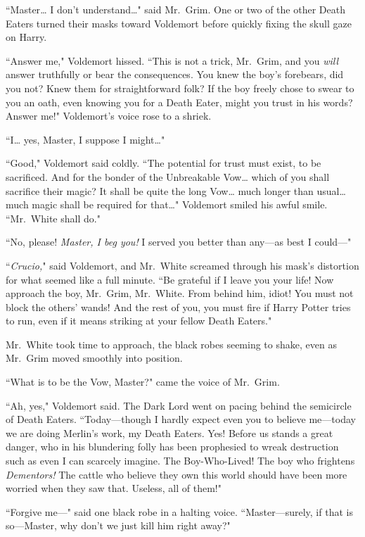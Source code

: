 ``Master{\ldots} I don't understand{\ldots}" said Mr.~Grim. One or two of the other Death Eaters turned their masks toward Voldemort before quickly fixing the skull gaze on Harry.

``Answer me," Voldemort hissed. ``This is not a trick, Mr.~Grim, and you \emph{will} answer truthfully or bear the consequences. You knew the boy's forebears, did you not? Knew them for straightforward folk? If the boy freely chose to swear to you an oath, even knowing you for a Death Eater, might you trust in his words? Answer me!" Voldemort's voice rose to a shriek.

``I{\ldots} yes, Master, I suppose I might{\ldots}"

``Good," Voldemort said coldly. ``The potential for trust must exist, to be sacrificed. And for the bonder of the Unbreakable Vow{\ldots} which of you shall sacrifice their magic? It shall be quite the long Vow{\ldots} much longer than usual{\ldots} much magic shall be required for that{\ldots}" Voldemort smiled his awful smile. ``Mr.~White shall do."

``No, please! \emph{Master, I beg you!} I served you better than any—as best I could—"

``\emph{Crucio,}" said Voldemort, and Mr.~White screamed through his mask's distortion for what seemed like a full minute. ``Be grateful if I leave you your life! Now approach the boy, Mr.~Grim, Mr.~White. From behind him, idiot! You must not block the others' wands! And the rest of you, you must fire if Harry Potter tries to run, even if it means striking at your fellow Death Eaters."

Mr.~White took time to approach, the black robes seeming to shake, even as Mr.~Grim moved smoothly into position.

``What is to be the Vow, Master?" came the voice of Mr.~Grim.

``Ah, yes," Voldemort said. The Dark Lord went on pacing behind the semicircle of Death Eaters. ``Today—though I hardly expect even you to believe me—today we are doing Merlin's work, my Death Eaters. Yes! Before us stands a great danger, who in his blundering folly has been prophesied to wreak destruction such as even I can scarcely imagine. The Boy-Who-Lived! The boy who frightens \emph{Dementors!} The cattle who believe they own this world should have been more worried when they saw that. Useless, all of them!"

``Forgive me—" said one black robe in a halting voice. ``Master—surely, if that is so—Master, why don't we just kill him right away?"

